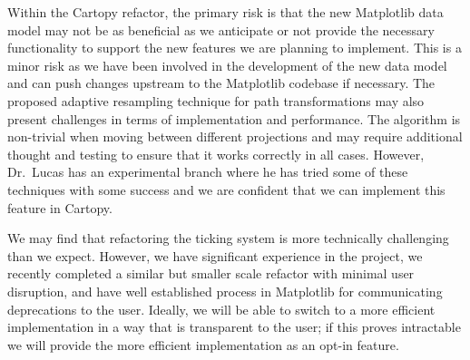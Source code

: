\documentclass[12pt]{article}
\numberwithin{page}{section}
\begin{document}
Within the Cartopy refactor, the primary risk is that the new Matplotlib data
model may not be as beneficial as we anticipate or not provide the necessary
functionality to support the new features we are planning to implement. This is
a minor risk as we have been involved in the development of the new data model
and can push changes upstream to the Matplotlib codebase if necessary.
The proposed adaptive resampling technique for path transformations may also
present challenges in terms of implementation and performance. The algorithm
is non-trivial when moving between different projections and may require additional
thought and testing to ensure that it works correctly in all cases.
However, Dr.\ Lucas has an experimental branch where he has tried some of these
techniques with some success and we are confident that we can implement this
feature in Cartopy.

We may find that refactoring the ticking system is more technically challenging
than we expect.  However, we have significant experience in the project, we
recently completed a similar but smaller scale refactor with minimal user
disruption, and have well established process in Matplotlib for communicating
deprecations to the user.  Ideally, we will be able to switch to a more
efficient implementation in a way that is transparent to the user; if this proves
intractable we will provide the more efficient implementation as an opt-in feature.

\end{document}
